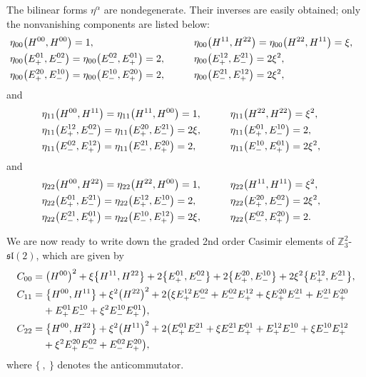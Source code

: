 \documentclass[pdftex]{sigma}
\numberwithin{equation}{section}
\theoremstyle{definition}
\def\sl{\mathfrak{sl}}
\def\Zsl{$\mathbb{Z}_3^2$-$\sl(2)$}
\begin{document}
The bilinear forms $\eta^{\alpha}$ are nondegenerate.
Their inverses are easily obtained; only the nonvanishing components are listed below:
\begin{alignat*}{3}
	&\eta_{00}\bigl(H^{00},H^{00}\bigr)= 1, \qquad&&
	\eta_{00}\bigl(H^{11},H^{22}\bigr)= \eta_{00}\bigl(H^{22},H^{11}\bigr) = \xi,&
	\notag \\
	&\eta_{00}\bigl(E_+^{01},E_-^{02}\bigr)= \eta_{00}\bigl(E_-^{02},E_+^{01}\bigr) = 2,
	\qquad & &
	\eta_{00}\bigl(E_+^{12},E_-^{21}\bigr)= 2\xi^2,&
	\notag \\
	&\eta_{00}\bigl(E_+^{20},E_-^{10}\bigr)= \eta_{00}\bigl(E_-^{10},E_+^{20}\bigr) = 2,
	\qquad &&
	\eta_{00}\bigl(E_-^{21},E_+^{12}\bigr)= 2\xi^2,&
\end{alignat*}
and
\begin{alignat*}{3}
	&\eta_{11}\bigl(H^{00}, H^{11}\bigr)= \eta_{11}\bigl(H^{11}, H^{00}\bigr) = 1,
	\qquad&&
	\eta_{11}\bigl(H^{22}, H^{22}\bigr)= \xi^2,&
	\notag \\
	&\eta_{11}\bigl(E_+^{12},E_-^{02}\bigr)= \eta_{11}\bigl(E_+^{20},E_-^{21}\bigr) = 2\xi,
	\qquad &&
	\eta_{11}\bigl(E_+^{01},E_-^{10}\bigr)= 2,&
	\notag \\
	&\eta_{11}\bigl(E_-^{02},E_+^{12}\bigr)= \eta_{11}\bigl(E_-^{21},E_+^{20}\bigr) =2,
	\qquad &&
	\eta_{11}\bigl(E_-^{10},E_+^{01}\bigr)= 2\xi^2,&
\end{alignat*}
and
\begin{alignat*}{3}
	&\eta_{22}\bigl(H^{00}, H^{22}\bigr)= \eta_{22}\bigl(H^{22}, H^{00}\bigr) = 1,
	\qquad&&
	\eta_{22}\bigl(H^{11}, H^{11}\bigr)= \xi^2,&
	\notag \\
	&\eta_{22}\bigl(E_+^{01}, E_-^{21}\bigr)= \eta_{22}\bigl(E_+^{12}, E_-^{10}\bigr) = 2,
	\qquad&&
	\eta_{22}\bigl(E_+^{20}, E_-^{02}\bigr)= 2\xi^2,&
	\notag \\
	&\eta_{22}\bigl(E_-^{21}, E_+^{01}\bigr)= \eta_{22}\bigl(E_-^{10}, E_+^{12}\bigr) = 2\xi,
	\qquad &&
	\eta_{22}\bigl(E_-^{02}, E_+^{20}\bigr)= 2.&
\end{alignat*}

We are now ready to write down the graded 2nd order Casimir elements of \Zsl, which are given by
\begin{align*}
	&C_{00}= \bigl(H^{00}\bigr)^2 + \xi \bigl\{ H^{11},H^{22}\bigr\} + 2 \bigl\{E_+^{01},E_-^{02} \bigr\} + 2\bigl\{E_+^{20}, E_-^{10} \bigr\} + 2\xi^2\bigl\{ E_+^{12},E_-^{21} \bigr\},
	\notag \\
	&C_{11}= \bigl\{H^{00}, H^{11} \bigr\} + \xi^2 \bigl(H^{22}\bigr)^2 + 2\bigl(\xi E_+^{12}E_-^{02} + E_-^{02}E_+^{12} +\xi E_+^{20} E_-^{21} + E_-^{21} E_+^{20}
	\notag \\
	&\hphantom{C_{11}=}{} + E_+^{01} E_-^{10} + \xi^2 E_-^{10} E_+^{01}\bigr),
	\notag \\
	&C_{22}= \bigl\{ H^{00}, H^{22} \bigr\} + \xi^2 \bigl(H^{11}\bigr)^2 + 2\bigl(E_+^{01} E_-^{21} + \xi E_-^{21} E_+^{01} + E_+^{12} E_-^{10} + \xi E_-^{10} E_+^{12}
	\notag \\
	&\hphantom{C_{22}=}{} + \xi^2 E_+^{20} E_-^{02} + E_-^{02} E_+^{20}\bigr),
\end{align*}
where $\{ \ , \ \}$ denotes the anticommutator.
\end{document}
